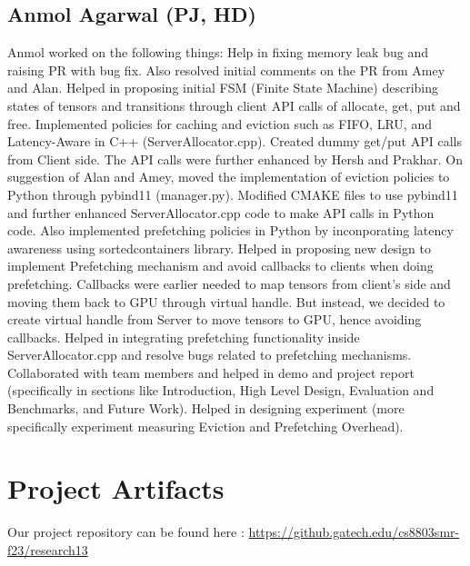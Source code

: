 \documentclass{article}
\begin{document}
\subsection{Anmol Agarwal (PJ, HD)}
Anmol worked on the following things:
Help in fixing memory leak bug and raising PR with bug fix. Also resolved initial comments on the PR from Amey and Alan.
Helped in proposing initial FSM (Finite State Machine) describing states of tensors and transitions through client API calls
of allocate, get, put and free.
Implemented policies for caching and eviction such as FIFO, LRU, and Latency-Aware in C++ (ServerAllocator.cpp). 
Created dummy get/put API calls from Client side. The API calls were further enhanced by Hersh and Prakhar.
On suggestion of Alan and Amey, moved the implementation of eviction policies to Python through pybind11 (manager.py).
Modified CMAKE files to use pybind11 and further enhanced ServerAllocator.cpp code to make API calls in Python code.
Also implemented prefetching policies in Python by inconporating latency awareness using sortedcontainers library.
Helped in proposing new design to implement Prefetching mechanism and avoid callbacks to clients when doing prefetching.
Callbacks were earlier needed to map tensors from client's side and moving them back to GPU through virtual handle. But instead,
we decided to create virtual handle from Server to move tensors to GPU, hence avoiding callbacks.
Helped in integrating prefetching functionality inside ServerAllocator.cpp and resolve bugs related to prefetching mechanisms.
Collaborated with team members and helped in demo and project report (specifically in sections like Introduction, High Level Design,
Evaluation and Benchmarks, and Future Work).
Helped in designing experiment (more specifically experiment measuring Eviction and Prefetching Overhead).

\section{Project Artifacts}
Our project repository can be found here : \url{https://github.gatech.edu/cs8803smr-f23/research13}

\printbibliography

% 


\end{document}
